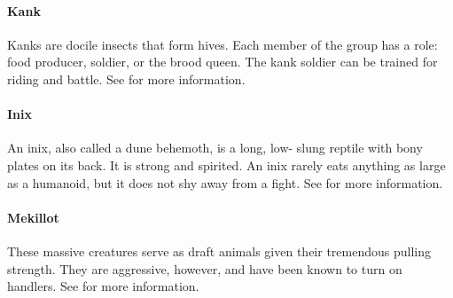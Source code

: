\begin{multicols}{2}
\paragraph{Kank}
\label{itmmnt:kank}
Kanks are docile insects that form hives. Each member
of the group has a role: food producer, soldier, or
the brood queen. The kank soldier can be trained for
riding and battle. See  for
more information.

\paragraph{Inix}
\label{itmmnt:inix}
An inix, also called a dune behemoth, is a long, low-
slung reptile with bony plates on its back. It is strong
and spirited. An inix rarely eats anything as large as
a humanoid, but it does not shy away from a fight. See
 for more information.

\paragraph{Mekillot}
\label{itmmnt:mekillot}
These massive creatures serve as draft animals
given their tremendous pulling strength. They are
aggressive, however, and have been known to turn
on handlers. See  for
more information.

\end{multicols}
